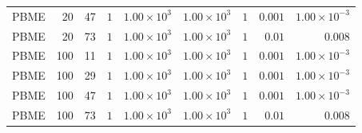 \begin{landscape}
\begin{longtable}{l r r r r r r r r}
PBME & 20 & 47 & $1$ & $1.00\times10^{3}$ & $1.00\times10^{3}$ & $1$ & $0.001$ & $1.00\times10^{-3}$ \\
PBME & 20 & 73 & $1$ & $1.00\times10^{3}$ & $1.00\times10^{3}$ & $1$ & $0.01$ & $0.008$ \\
PBME & 100 & 11 & $1$ & $1.00\times10^{3}$ & $1.00\times10^{3}$ & $1$ & $0.001$ & $1.00\times10^{-3}$ \\
PBME & 100 & 29 & $1$ & $1.00\times10^{3}$ & $1.00\times10^{3}$ & $1$ & $0.001$ & $1.00\times10^{-3}$ \\
PBME & 100 & 47 & $1$ & $1.00\times10^{3}$ & $1.00\times10^{3}$ & $1$ & $0.001$ & $1.00\times10^{-3}$ \\
PBME & 100 & 73 & $1$ & $1.00\times10^{3}$ & $1.00\times10^{3}$ & $1$ & $0.01$ & $0.008$ \\
\end{longtable}
\endgroup
\end{landscape}




